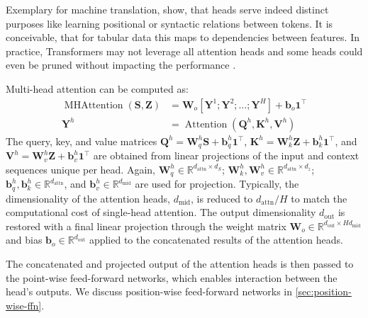 Exemplary for machine translation, \textcite[][5797]{voitaAnalyzingMultiHeadSelfAttention2019} show, that heads serve indeed distinct purposes like learning positional or syntactic relations between tokens. It is conceivable, that for tabular data this maps to dependencies between features. In practice, Transformers may not leverage all attention heads and some heads could even be pruned without impacting the performance \autocites[][14022]{michelAreSixteenHeads2019}[][5805]{voitaAnalyzingMultiHeadSelfAttention2019}.

Multi-head attention can be computed as:
\begin{equation}
    \begin{aligned}
        \operatorname{MHAttention}(\mathbf{S}, \mathbf{Z}) & = \mathbf{W}_{o}\left[\mathbf{Y}^{1};\mathbf{Y}^{2};\ldots;\mathbf{Y}^{H} \right] + \mathbf{b}_{o}\mathbf{1}^{\top} \\
        \mathbf{Y}^{h}                                     & = \operatorname{Attention}(\mathbf{Q}^h, \mathbf{K}^h, \mathbf{V}^h)
    \end{aligned}
\end{equation}
The query, key, and value matrices  $\mathbf{Q}^{h}=\mathbf{W}^h_q \mathbf{S} + \mathbf{b}^h_q\mathbf{1}^{\top}$, $\mathbf{K}^{h}=\mathbf{W}_k^h \mathbf{Z} + \mathbf{b}_k^h\mathbf{1}^{\top}$, and $\mathbf{V}^{h}=\mathbf{W}_v^h \mathbf{Z} + \mathbf{b}_v^h\mathbf{1}^{\top}$ are obtained from linear projections of the input and context sequences unique per head. Again, $\mathbf{W}^{h}_{q} \in \mathbb{R}^{d_{\mathrm{attn}}\times d_{S}}$; $\mathbf{W}^{h}_{k}, \mathbf{W}^{h}_{v} \in \mathbb{R}^{d_{\mathrm{attn}}\times d_z}$; $\mathbf{b}^h_q, \mathbf{b}^h_k \in \mathbb{R}^{d_{\mathrm{attn}}}$, and $\mathbf{b}^h_v \in \mathbb{R}^{d_{\mathrm{mid}}}$ are used for projection. Typically, the dimensionality of the attention heads, $d_{\mathrm{mid}}$, is reduced to $d_{\mathrm{attn}}/H$ to match the computational cost of single-head attention. The output dimensionality $d_{\mathrm{out}}$ is restored with a final linear projection through the weight matrix $\mathbf{W}_{o} \in \mathbb{R}^{d_{\mathrm{out}}\times Hd_{\mathrm{mid}}}$ and bias $\mathbf{b}_o \in \mathbb{R}^{d_{\mathrm{out}}}$ applied to the concatenated results of the attention heads.

The concatenated and projected output of the attention heads is then passed to the point-wise feed-forward networks, which enables interaction between the head's outputs. We discuss position-wise feed-forward networks in \cref{sec:position-wise-ffn}.

